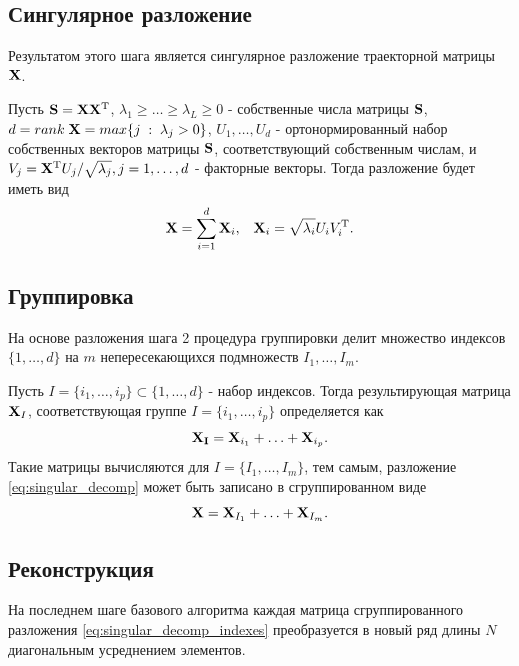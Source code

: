 \documentclass[specialist, substylefile = spbu.rtx,
			   subf, href, 12pt]{disser}
\begin{document}
\subsection{Сингулярное разложение}

Результатом этого шага является сингулярное разложение траекторной матрицы $\bold{X}$. 

Пусть $\bold{S} = \bold{X}\bold{X}^\mathrm{T}$, $\lambda_1 \geq \dotsc \geq \lambda_L \geq 0$ - собственные числа матрицы $\bold{S}$, $d = rank\;\bold{X} = max\{j\;:\;\lambda_j > 0\}$, $U_1, \dotsc, U_d$ - ортонормированный набор собственных векторов матрицы $\bold{S}$, соответствующий собственным числам, и $V_j = \bold{X}^\mathrm{T}U_j/\sqrt{\lambda_j}, j = 1, \dotsc, d$ - факторные векторы. Тогда разложение будет иметь вид
\begin{equation}\label{eq:singular_decomp}
	\bold{X} = \sum\limits_{i=1}^{d}\bold{X}_i, \;\;\; \bold{X}_i = \sqrt{\lambda_i}U_iV_i^\mathrm{T}. 
\end{equation}

\subsection{Группировка}

На основе разложения шага 2 процедура группировки делит множество индексов $\{1, \dotsc, d\}$ на $m$ непересекающихся подмножеств $I_1, \dotsc, I_m$.

Пусть $I = \{i_1, \dotsc, i_p\} \subset \{1, \dotsc, d\}$ - набор индексов. Тогда результирующая матрица $\bold{X}_I$, соответствующая группе $I = \{i_1, \dotsc, i_p\}$ определяется как 
$$\bold{X_I} = \bold{X}_{i_1} + \dotsc + \bold{X}_{i_p}.$$
Такие матрицы вычисляются для $I = \{I_1, \dotsc, I_m\}$, тем самым, разложение \eqref{eq:singular_decomp} может быть записано в сгруппированном виде
\begin{equation}\label{eq:singular_decomp_indexes}
	\bold{X} = \bold{X}_{I_1} + \dotsc + \bold{X}_{I_m}.
\end{equation}

\subsection{Реконструкция}

На последнем шаге базового алгоритма каждая матрица сгруппированного разложения \eqref{eq:singular_decomp_indexes} преобразуется в новый ряд длины $ N $ диагональным усреднением элементов.
\end{document}
